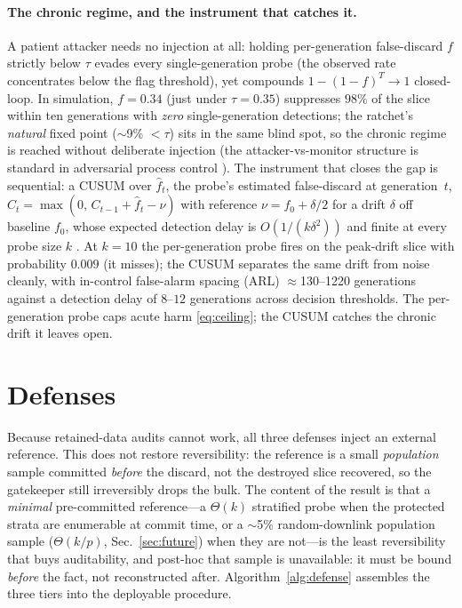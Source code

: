 \documentclass[conference]{IEEEtran}
\begin{document}
\paragraph{The chronic regime, and the instrument that catches it.}
A patient attacker needs no injection at all: holding per-generation false-discard $f$ strictly below $\tau$
evades every single-generation probe (the observed rate concentrates below the flag threshold), yet compounds
$1-(1-f)^T\!\to\!1$ closed-loop. In simulation, $f{=}0.34$ (just under $\tau{=}0.35$) suppresses $98\%$ of the
slice within ten generations with \emph{zero} single-generation detections; the ratchet's \emph{natural} fixed
point ($\sim$9\% $<\tau$) sits in the same blind spot, so the chronic regime is reached without deliberate
injection (the attacker-vs-monitor structure is standard in adversarial process control
\cite{cardenas2011,mo2009}). The instrument that closes the gap is sequential: a CUSUM over $\hat f_t$, the
probe's estimated false-discard at generation~$t$, $C_t=\max(0,\,C_{t-1}+\hat f_t-\nu)$ with reference
$\nu=f_0+\delta/2$ for a drift $\delta$ off baseline $f_0$, whose expected detection delay is
$O(1/(k\delta^2))$ and finite at every probe size $k$ \cite{siegmund1985}. At $k{=}10$ the per-generation
probe fires on the peak-drift slice with probability $0.009$ (it misses); the CUSUM separates the same drift
from noise cleanly, with in-control false-alarm spacing (ARL) $\approx$130--1220 generations against a
detection delay of $8$--$12$ generations across decision thresholds. The per-generation probe caps acute harm
\eqref{eq:ceiling}; the CUSUM catches the chronic drift it leaves open.

\section{Defenses}
\label{sec:defenses}
Because retained-data audits cannot work, all three defenses inject an external reference. This does not restore
reversibility: the reference is a small \emph{population} sample committed \emph{before} the discard, not the
destroyed slice recovered, so the gatekeeper still irreversibly drops the bulk. The content of the result is that
a \emph{minimal} pre-committed reference---a $\Theta(k)$ stratified probe when the protected strata are
enumerable at commit time, or a $\sim$5\% random-downlink population sample ($\Theta(k/p)$,
Sec.~\ref{sec:future}) when they are not---is the least
reversibility that buys auditability, and post-hoc that sample is unavailable: it must be bound \emph{before}
the fact, not reconstructed after. Algorithm~\ref{alg:defense} assembles the three tiers into the
deployable procedure.
\end{document}
